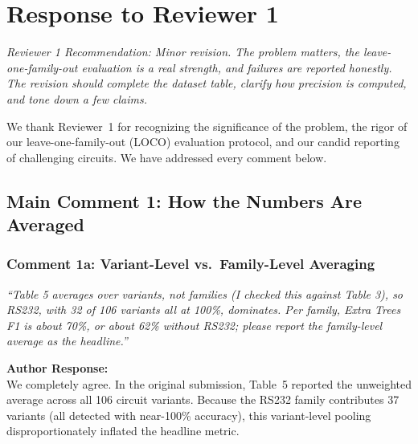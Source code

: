 \documentclass[11pt,a4paper]{article}
\newcommand{\reviewercomment}[1]{\vspace{4pt}\noindent\textcolor{revcomment}{\textit{``#1''}}\vspace{4pt}}
\newcommand{\authorresponse}{\noindent\textbf{Author Response:}}
\begin{document}
\newpage
\section*{\textcolor{reviewerblue}{\Large Response to Reviewer 1}}

\noindent\textit{Reviewer 1 Recommendation: Minor revision. The problem matters, the leave-one-family-out evaluation is a real strength, and failures are reported honestly. The revision should complete the dataset table, clarify how precision is computed, and tone down a few claims.}

\vspace{4pt}
\noindent We thank Reviewer~1 for recognizing the significance of the problem, the rigor of our leave-one-family-out (LOCO) evaluation protocol, and our candid reporting of challenging circuits. We have addressed every comment below.

\subsection*{Main Comment 1: How the Numbers Are Averaged}

\subsubsection*{Comment 1a: Variant-Level vs.\ Family-Level Averaging}

\reviewercomment{Table 5 averages over variants, not families (I checked this against Table 3), so RS232, with 32 of 106 variants all at 100\%, dominates. Per family, Extra Trees F1 is about 70\%, or about 62\% without RS232; please report the family-level average as the headline.}

\authorresponse\\
We completely agree. In the original submission, Table~5 reported the unweighted average across all 106 circuit variants. Because the RS232 family contributes 37 variants (all detected with near-100\% accuracy), this variant-level pooling disproportionately inflated the headline metric.
\end{document}
